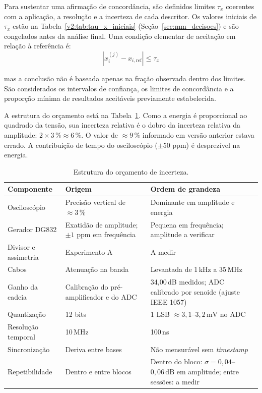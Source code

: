 Para sustentar uma afirmação de concordância, são definidos limites \(\tau_x\) coerentes com a aplicação, a resolução e a incerteza de cada descritor. Os valores iniciais de \(\tau_x\) estão na Tabela~\ref{v2:tab:tau_x_iniciais} (Seção~\ref{sec:mm_decisoes}) e são congelados antes da análise final. Uma condição elementar de aceitação em relação à referência é:
\begin{equation}
	\left|x_i^{(j)} - x_{i,\mathrm{ref}} \right| \leq \tau_x
	\label{v2:eq:criterio_aceitacao_secao5}
\end{equation}

\noindent
mas a conclusão não é baseada apenas na fração observada dentro dos limites. São considerados os intervalos de confiança, os limites de concordância e a proporção mínima de resultados aceitáveis previamente estabelecida.

 A estrutura do orçamento está na Tabela~\ref{v2:tab:orcamento_incerteza}. Como a energia é proporcional ao quadrado da tensão, sua incerteza relativa é o dobro da incerteza relativa da amplitude: \(2 \times 3\,\% \approx 6\,\%\). O valor de \(\approx 9\,\%\) informado em versão anterior estava errado. A contribuição de tempo do osciloscópio (\(\pm 50\) ppm) é desprezível na energia.

\begin{table}[htbp]
	\centering
	\footnotesize
		\caption{Estrutura do orçamento de incerteza.}
	\label{v2:tab:orcamento_incerteza}
	\begin{tabular}{|p{}|p{}|p{}|}
		\hline
		\textbf{Componente} & \textbf{Origem} & \textbf{Ordem de grandeza} \\
		\hline
		Osciloscópio & Precisão vertical de \(\approx 3\,\%\) & Dominante em amplitude e energia \\
		\hline
		Gerador DG832 & Exatidão de amplitude; \(\pm 1\) ppm em frequência & Pequena em frequência; amplitude a verificar \\
		\hline
		Divisor e assimetria & Experimento A & A medir \\
		\hline
		Cabos & Atenuação na banda & Levantada de 1\,kHz a 35\,MHz \\
		\hline
		Ganho da cadeia & Calibração do pré-amplificador e do ADC & 34,00\,dB medidos; ADC calibrado por senoide (ajuste IEEE 1057) \\
		\hline
		Quantização & 12 bits & 1 LSB \(\approx 3{,}1\)--\(3{,}2\,\mathrm{mV}\) no ADC \\
		\hline
		Resolução temporal & 10\,MHz & 100\,ns \\
		\hline
		Sincronização & Deriva entre bases & Não mensurável sem \textit{timestamp} \\
		\hline
		Repetibilidade & Dentro e entre blocos & Dentro do bloco: \(\sigma = 0{,}04\)--\(0{,}06\,\mathrm{dB}\) em amplitude; entre sessões: a medir \\
		\hline
	\end{tabular}
\end{table}

